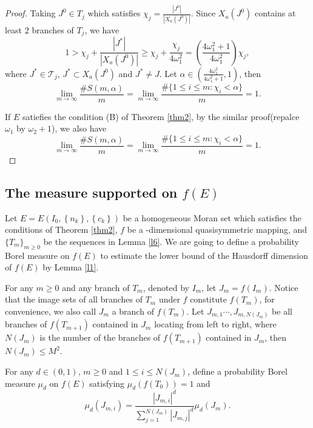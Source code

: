 \documentclass[reqno]{amsart}
\theoremstyle{plain}
\theoremstyle{definition}
\theoremstyle{remark}
\numberwithin{equation}{section} \DeclareMathOperator\intr{int}
\begin{document}
\begin{proof}
Taking $J^0\in T_j$ which satisfies $\chi_j=\frac{\left | J^0 \right |}{\left |X_a(J^0) \right |} $.
Since $X_a(J^0)$  contains at least $2$ branches of $T_j$, we have
\begin{equation*}
1>\chi_j+\frac{\left | J^* \right |}{\left |X_a(J^0) \right |}\ge \chi_j+\frac{\chi_j}{4\omega_1^2}=(\frac{4\omega_1^2+1}{4\omega_1^2} )\chi_j,
\end{equation*}
where $J^*\in \mathcal{T}_j$, $J^*\subset X_a(J^0)$ and $J^*\neq J$. Let $\alpha \in (\frac{4\omega_1^2}{4\omega_1^2+1},1)$, then
\begin{equation*}
\lim_{m\to \infty} \frac{\#S(m,\alpha )}{m} =\lim_{m\to \infty}\frac{\#\{1\le i\le m:\chi_i<\alpha\}}{m} =1.
\end{equation*}


If $E$ satiefies the condition {\rm(B)} of Theorem {\rm\ref{thm2}},
 by the similar proof(repalce $\omega_1$ by $\omega_2+1$), we also have
\begin{equation*}
\lim_{m\to \infty} \frac{\#S(m,\alpha )}{m} =\lim_{m\to \infty} \frac{\#\{1\le i\le m:\chi_i<\alpha\}}{m} =1.
\end{equation*}





\end{proof}


\subsection{The measure supported on $f(E)$}
Let $E=E(I_{0},\left\{n_{k}\right\},\left\{c_{k}\right\})$ be a homogeneous Moran set which satisfies the conditions of Theorem \ref{thm2}, $f$ be a -dimensional quasisymmetric mapping, and $\{T_{m}\}_{m\ge0}$ be the sequences in Lemma \ref{l6}. We are going to define a probability Borel measure on $f(E)$ to estimate the lower bound of the Hausdorff dimension of $f(E)$ by Lemma \ref{l1}.


For any $m\ge0$ and any  branch of $T_m$, denoted by $I_m$, let $J_{m}=f(I_m)$. Notice that the image sets of all branches of $T_m$ under $f$ constitute $f(T_m)$, for convenience,  we also call $J_m$ a branch of $f(T_m)$. Let $J_{m,1}\cdots,J_{m,N(J_{m})}$ be all branches of $f(T_{m+1})$ contained  in $J_{m}$  locating from left to right, where $N(J_{m})$ is the number of the branches of $f(T_{m+1})$ contained in $J_{m}$, then $N(J_{m})\le M^{2}$.


For any $d\in(0,1)$, $m\ge0$ and $1\le i\le N(J_{m})$, define a probability Borel measure $\mu_{d}$ on $f(E)$ satisfying $\mu _d(f(T_0))=1$ and
\begin{equation}
\mu_d(J_{m,i})=\frac{\left | J_{m,i} \right |^d }{\sum_{j=1}^{N(J_{m})}\left | J_{m,j} \right |^d }\mu_d(J_{m}).
\end{equation}
\bigskip
\end{document}

